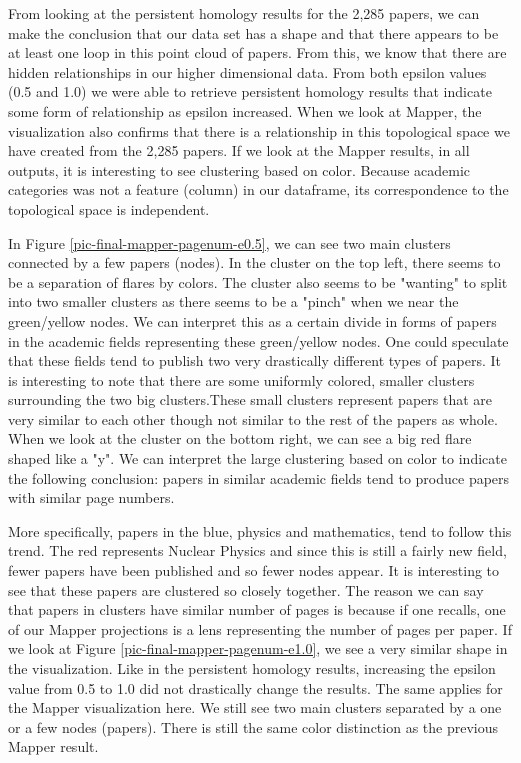 \documentclass[12pt]{article}
\theoremstyle{definition}
\begin{document}
From looking at the persistent homology results for the 2,285 papers, we can make the conclusion that our data set has a shape and that there appears to be at least one loop in this point cloud of papers. From this, we know that there are hidden relationships in our higher dimensional data. From both epsilon values (0.5 and 1.0) we were able to retrieve persistent homology results that indicate some form of relationship as epsilon increased. When we look at Mapper, the visualization also confirms that there is a relationship in this topological space we have created from the 2,285 papers. If we look at the Mapper results, in all outputs, it is interesting to see clustering based on color. Because academic categories was not a feature (column) in our dataframe, its correspondence to the topological space is independent. 
\newline 
\par In Figure \ref{pic-final-mapper-pagenum-e0.5}, we can see two main clusters connected by a few papers (nodes). In the cluster on the top left, there seems to be a separation of flares by colors. The cluster also seems to be "wanting" to split into two smaller clusters as there seems to be a "pinch" when we near the green/yellow nodes. We can interpret this as a certain divide in forms of papers in the academic fields representing these green/yellow nodes. One could speculate that these fields tend to publish two very drastically different types of papers. It is interesting to note that there are some uniformly colored, smaller clusters surrounding the two big clusters.These small clusters represent papers that are very similar to each other though not similar to the rest of the papers as  whole. When we look at the cluster on the bottom right, we can see a big red flare shaped like a "y". We can interpret the large clustering based on color to indicate the following conclusion: papers in similar academic fields tend to produce papers with similar page numbers. 
\newline 
\par More specifically, papers in the blue, physics and mathematics, tend to follow this trend. The red represents Nuclear Physics and since this is still a fairly new field, fewer papers have been published and so fewer nodes appear. It is interesting to see that these papers are clustered so closely together. The reason we can say that papers in clusters have similar number of pages is because if one recalls, one of our Mapper projections is a lens representing the number of pages per paper. If we look at Figure \ref{pic-final-mapper-pagenum-e1.0}, we see a very similar shape in the visualization. Like in the persistent homology results, increasing the epsilon value from 0.5 to 1.0 did not drastically change the results. The same applies for the Mapper visualization here. We still see two main clusters separated by a one or a few nodes (papers). There is still the same color distinction as the previous Mapper result. 
\end{document}
